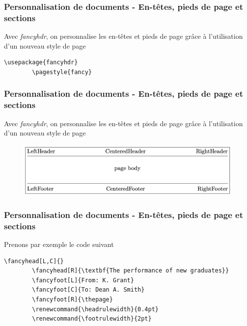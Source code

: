\begin{frame}[fragile]
    \frametitle{Personnalisation de documents - En-têtes, pieds de page et sections}
    Avec \textcolor{vibrant_green}{\textit{fancyhdr}}\footnotemark, on personnalise les en-têtes et pieds de page grâce à l'utilisation d'un nouveau style de page
    \vfill
    \begin{lstlisting}[xleftmargin=1cm]
        \usepackage{fancyhdr}
        \pagestyle{fancy}
    \end{lstlisting}
\end{frame}

\begin{frame}[fragile]
    \frametitle{Personnalisation de documents - En-têtes, pieds de page et sections}
    Avec \textcolor{vibrant_green}{\textit{fancyhdr}}\footnotemark, on personnalise les en-têtes et pieds de page grâce à l'utilisation d'un nouveau style de page
    \vfill
    \begin{figure}
        \centering
            \includegraphics[scale=0.25]{./figures/fancyhdr.png}
            \label{fig: fancyhdr}
    \end{figure}
\end{frame}

\begin{frame}[fragile]
    \frametitle{Personnalisation de documents - En-têtes, pieds de page et sections}
    Prenons par exemple le code suivant
    \vfill
    \begin{lstlisting}[xleftmargin=-1.75cm]
        \fancyhead[L,C]{}
        \fancyhead[R]{\textbf{The performance of new graduates}}
        \fancyfoot[L]{From: K. Grant}
        \fancyfoot[C]{To: Dean A. Smith}
        \fancyfoot[R]{\thepage}
        \renewcommand{\headrulewidth}{0.4pt}
        \renewcommand{\footrulewidth}{2pt}
    \end{lstlisting}
    \vfill
\end{frame}

